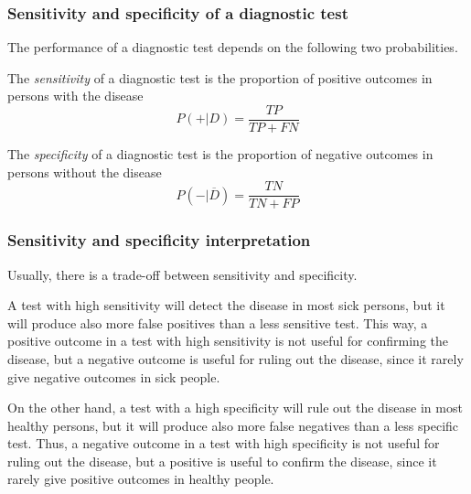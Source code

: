 \begin{frame}
\frametitle{Sensitivity and specificity of a diagnostic test}
The performance of a diagnostic test depends on the following two probabilities.
\begin{definition}[Sensitivity]
The \emph{sensitivity} of a diagnostic test is the proportion of positive outcomes in persons with the disease 
\[
P(+|D)=\frac{TP}{TP+FN}
\]
\end{definition}

\begin{definition}[Specificity]
The \emph{specificity} of a diagnostic test is the proportion of negative outcomes in persons without the disease
\[
P(-|\overline{D})=\frac{TN}{TN+FP}
\]
\end{definition}
\end{frame}


\begin{frame}
\frametitle{Sensitivity and specificity interpretation}
Usually, there is a trade-off between sensitivity and specificity.  

A test with high sensitivity will detect the disease in most sick persons, but it will produce also more false positives than a less sensitive test. 
This way, a positive outcome in a test with high sensitivity is not useful for confirming the disease, but a negative outcome is useful for ruling out the disease, since it rarely give negative outcomes in sick people.

On the other hand, a test with a high specificity will rule out the disease in most healthy persons, but it will produce also more false negatives than a less specific test. 
Thus, a negative outcome in a test with high specificity is not useful for ruling out the disease, but a positive is useful to confirm the disease, since it rarely give positive outcomes in healthy people.  
\end{frame}


